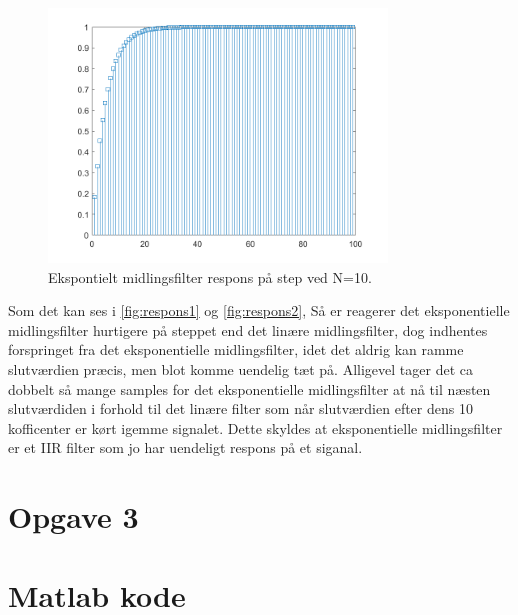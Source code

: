 \documentclass[12pt]{article}
\begin{document}
\begin{figure}[H]
	\centering
	\includegraphics[width=90mm]{Img/respons_ex.png}
	\caption{Ekspontielt midlingsfilter respons på step ved N=10.}
	\label{fig:respons2}
\end{figure}
Som det kan ses i \autoref{fig:respons1} og \autoref{fig:respons2}, Så er reagerer det eksponentielle midlingsfilter hurtigere på steppet end det linære midlingsfilter, dog indhentes forspringet fra det eksponentielle midlingsfilter, idet det aldrig kan ramme slutværdien præcis, men blot komme uendelig tæt på. Alligevel tager det ca dobbelt så mange samples for det eksponentielle midlingsfilter at nå til næsten slutværdiden i forhold til det linære filter som når slutværdien efter dens 10 kofficenter er kørt igemme signalet. Dette skyldes at eksponentielle midlingsfilter er et IIR filter som jo har uendeligt respons på et siganal.


\section{Opgave 3}

\section{Matlab kode}	
\end{document}
